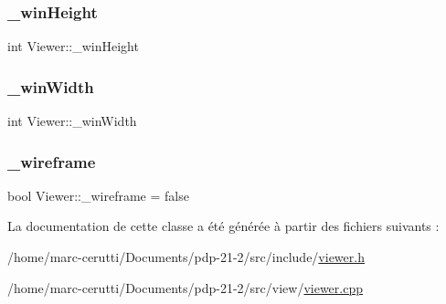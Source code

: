 \subsubsection{\texorpdfstring{\+\_\+win\+Height}{\_winHeight}}
{\footnotesize\ttfamily int Viewer\+::\+\_\+win\+Height\hspace{0.3cm}{\ttfamily [private]}}

\mbox{\label{class_viewer_a5ed35052dd2cafc37dcb9ebdc707b0ee}} 
\subsubsection{\texorpdfstring{\+\_\+win\+Width}{\_winWidth}}
{\footnotesize\ttfamily int Viewer\+::\+\_\+win\+Width\hspace{0.3cm}{\ttfamily [private]}}

\mbox{\label{class_viewer_a3316af44dc82836ab420a1c1dd7de738}} 
\subsubsection{\texorpdfstring{\+\_\+wireframe}{\_wireframe}}
{\footnotesize\ttfamily bool Viewer\+::\+\_\+wireframe = false\hspace{0.3cm}{\ttfamily [private]}}



La documentation de cette classe a été générée à partir des fichiers suivants \+:\begin{DoxyCompactItemize}
\item 
/home/marc-\/cerutti/\+Documents/pdp-\/21-\/2/src/include/\hyperlink{viewer_8h}{viewer.\+h}\item 
/home/marc-\/cerutti/\+Documents/pdp-\/21-\/2/src/view/\hyperlink{viewer_8cpp}{viewer.\+cpp}\end{DoxyCompactItemize}
